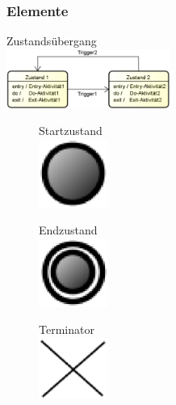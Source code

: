 \documentclass[11pt, a4paper]{article}
\begin{document}
\subsubsection{Elemente}

\vspace{1em}

\centering Zustandsübergang \\
\vspace{1em}
\centering \includegraphics[width=0.4\textwidth]{Zustand-Elemente/1.png}

\vspace{1em}

\begin{figure}[ht]
    \centering
    \begin{minipage}[t]{0.30\textwidth}
        \centering Startzustand \\
        \vspace{1em}
        \centering \includegraphics[width=0.2\textwidth]{Zustand-Elemente/2.png}
    \end{minipage}
    \centering
    \begin{minipage}[t]{0.30\textwidth}
        \centering Endzustand \\
        \vspace{1em}
        \centering \includegraphics[width=0.2\textwidth]{Zustand-Elemente/3.png}
    \end{minipage}
    \centering
    \begin{minipage}[t]{0.30\textwidth}
        \centering Terminator \\
        \vspace{1em}
        \centering \includegraphics[width=0.2\textwidth]{Zustand-Elemente/4.png}
    \end{minipage}
\end{figure}
\end{document}
